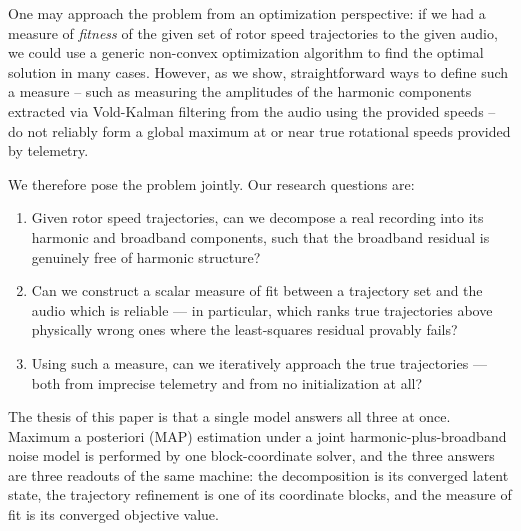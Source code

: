 \documentclass[journal]{IEEEtran}
\begin{document}
One may approach the problem from an optimization perspective: if we had
a measure of \emph{fitness} of the given set of rotor speed trajectories
to the given audio, we could use a generic non-convex optimization algorithm
to find the optimal solution in many cases. However, as we
show, straightforward ways to define such a measure -- such as measuring the
amplitudes of the harmonic components extracted via Vold-Kalman filtering from
the audio using the provided speeds -- do not reliably form a global maximum
at or near true rotational speeds provided by telemetry.

We therefore pose the problem jointly. Our research questions are:
\begin{enumerate}
\item Given rotor speed trajectories, can we decompose a real recording
  into its harmonic and broadband components, such that the broadband
  residual is genuinely free of harmonic structure?
\item Can we construct a scalar measure of fit between a trajectory set
  and the audio which is reliable --- in particular, which ranks true
  trajectories above physically wrong ones where the least-squares
  residual provably fails?
\item Using such a measure, can we iteratively approach the true
  trajectories --- both from imprecise telemetry and from no
  initialization at all?
\end{enumerate}
The thesis of this paper is that a single model answers all three at
once. Maximum a posteriori (MAP) estimation under a joint harmonic-plus-broadband
noise model is performed by one block-coordinate solver, and the three
answers are three readouts of the same machine: the decomposition is its
converged latent state, the trajectory refinement is one of its
coordinate blocks, and the measure of fit is its converged objective
value.
\end{document}
